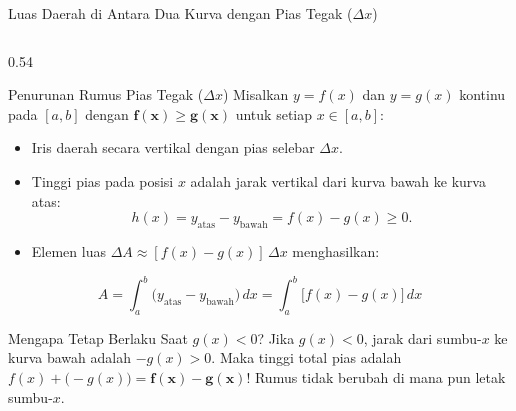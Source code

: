\documentclass[aspectratio=43,10pt]{beamer}
\begin{document}
\begin{frame}{Luas Daerah di Antara Dua Kurva dengan Pias Tegak ($\Delta x$)}
    \begin{columns}[c]
        \begin{column}{0.54\textwidth}
            \begin{block}{Penurunan Rumus Pias Tegak ($\Delta x$)}
                \scriptsize\abovedisplayskip=3pt\belowdisplayskip=3pt
                Misalkan $y = f(x)$ dan $y = g(x)$ kontinu pada $[a, b]$ dengan $\mathbf{f(x) \ge g(x)}$ untuk setiap $x \in [a, b]$:
                \begin{itemize}\itemsep=2pt
                    \item Iris daerah secara vertikal dengan pias selebar $\Delta x$.
                    \item Tinggi pias pada posisi $x$ adalah jarak vertikal dari kurva bawah ke kurva atas:
                    $$h(x) = y_{\text{atas}} - y_{\text{bawah}} = f(x) - g(x) \ge 0.$$
                    \item Elemen luas $\Delta A \approx [f(x) - g(x)]\,\Delta x$ menghasilkan:
                \end{itemize}
                $$\boxed{A = \int_{a}^{b} \big(y_{\text{atas}} - y_{\text{bawah}}\big)\,dx = \int_{a}^{b} \big[f(x) - g(x)\big]\,dx}$$
            \end{block}

            \begin{alertblock}{Mengapa Tetap Berlaku Saat $g(x) < 0$?}
                \scriptsize
                Jika $g(x) < 0$, jarak dari sumbu-$x$ ke kurva bawah adalah $-g(x) > 0$. Maka tinggi total pias adalah $f(x) + \big(-g(x)\big) = \mathbf{f(x) - g(x)}$! Rumus tidak berubah di mana pun letak sumbu-$x$.
            \end{alertblock}
        \end{column}


\end{columns}
\end{frame}
\end{document}
